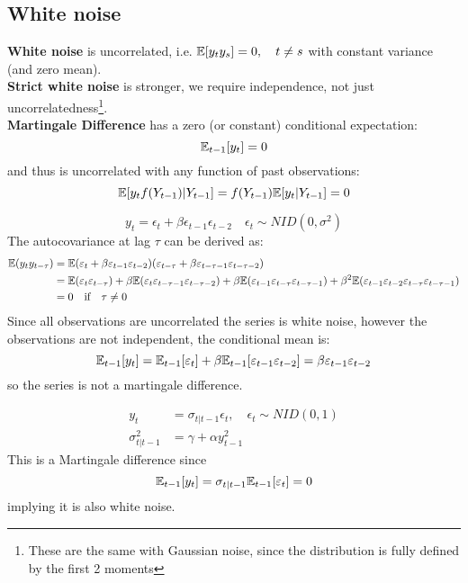 \documentclass[DIV=14,titlepage=false]{scrreprt}
\begin{document}
\subsection{White noise}
\textbf{White noise} is uncorrelated, i.e. $\mathbb{E}[y_t y_s] = 0, \quad t \neq s$ with constant variance (and zero mean).\\
\textbf{Strict white noise} is stronger, we require independence, not just uncorrelatedness\footnote{These are the same with Gaussian noise, since the distribution is fully defined by the first 2 moments}.\\
\textbf{Martingale Difference} has a zero (or constant) conditional expectation:
\[
    \mathbb{E}_{t-1}[y_t] = 0
\]
and thus is uncorrelated with any function of past observations:
\[
    \mathbb{E}[y_t f(Y_{t-1})|Y_{t-1}] = f(Y_{t-1})\mathbb{E}[y_t|Y_{t-1}] = 0
\]
\begin{example}
    \[
        y_t = \epsilon_t + \beta \epsilon_{t-1} \epsilon_{t-2} \quad \epsilon_t \sim NID(0,\sigma^2)
    \]
    The autocovariance at lag $\tau$ can be derived as:
    \begin{align*}
        \mathbb{E}(y_t y_{t-\tau}) &= \mathbb{E}(\varepsilon_t + \beta \varepsilon_{t-1} \varepsilon_{t-2} )(\varepsilon_{t-\tau} + \beta \varepsilon_{t-\tau-1} \varepsilon_{t-\tau-2})\\
        &= \mathbb{E}(\varepsilon_t \varepsilon_{t-\tau}) + \beta \mathbb{E}(\varepsilon_t \varepsilon_{t-\tau-1} \varepsilon_{t-\tau-2}) + \beta \mathbb{E}(\varepsilon_{t-1} \varepsilon_{t-\tau} \varepsilon_{t-\tau-1}) + \beta^2 \mathbb{E}(\varepsilon_{t-1} \varepsilon_{t-2} \varepsilon_{t-\tau} \varepsilon_{t-\tau-1})\\
        &= 0 \quad \text{if} \quad \tau \neq 0
    \end{align*}
    Since all observations are uncorrelated the series is white noise, however the observations are not independent, the conditional mean is:
    \[
        \mathbb{E}_{t-1}[y_t] = \mathbb{E}_{t-1}[\varepsilon_t] + \beta \mathbb{E}_{t-1}[\varepsilon_{t-1} \varepsilon_{t-2}] = \beta \varepsilon_{t-1} \varepsilon_{t-2}
    \]
    so the series is not a martingale difference.
\end{example}
\begin{example}[ARCH]
    \begin{align*}
        y_t &= \sigma_{t|t-1} \epsilon_t, \quad \epsilon_t \sim NID(0,1)\\
        \sigma_{t|t-1}^2 &= \gamma + \alpha y_{t-1}^2
    \end{align*}
    This is a Martingale difference since 
    \[
        \mathbb{E}_{t-1}[y_t] = \sigma_{t|t-1} \mathbb{E}_{t-1}[\varepsilon_t] = 0
    \]
    implying it is also white noise.
\end{example}
\end{document}
